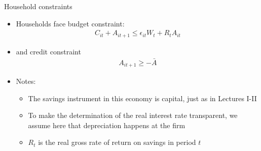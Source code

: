 \documentclass[9pt]{beamer}
\newcommand{\bit}{\begin{itemize}}
\newcommand{\eit}{\end{itemize}}
\begin{document}
\begin{frame}{Household constraints}

\bit
\setlength\itemsep{2em}

\item Households face budget constraint:
\begin{eqnarray}
C_{it} + A_{it+1} \leq \epsilon_{it} W_t + R_tA_{it} \nonumber
\end{eqnarray}
\item and credit constraint
\begin{eqnarray}
A_{it+1} \geq -\bar A \nonumber
\end{eqnarray}

\item Notes:
\bit
\setlength\itemsep{0.5em}
\item The savings instrument in this economy is capital, just as in Lectures I-II

\item To make the determination of the real interest rate transparent, we assume here that depreciation happens at the firm

\item $R_t$ is the real gross rate of return on savings in period $t$
\eit

\eit

\end{frame}
\end{document}
